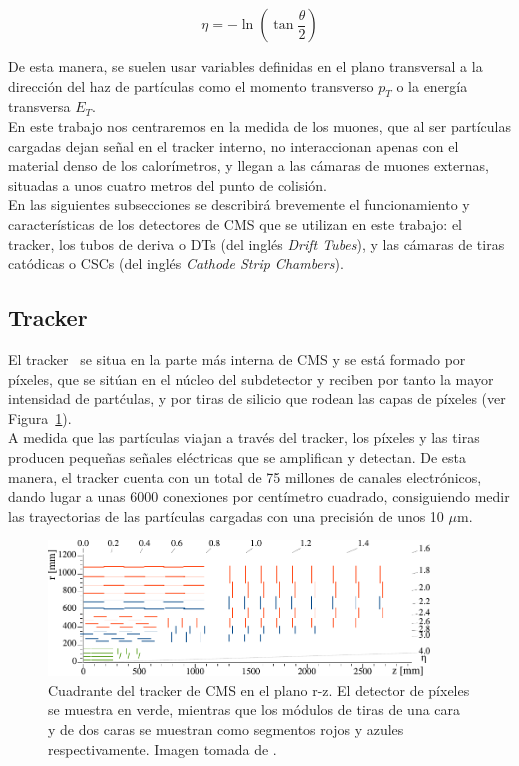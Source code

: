 \begin{equation}
  \eta = -\ln\left(\tan\dfrac{\theta}{2}\right)
\label{eq:eta}
\end{equation}


De esta manera, se suelen usar variables definidas en el plano transversal a la dirección del haz de partículas como el momento transverso $p_{T}$ o la energía transversa $E_{T}$. \\

En este trabajo nos centraremos en la medida de los muones, que al ser part\'iculas cargadas dejan se\~nal en el tracker interno, no interaccionan apenas con el material denso de los calor\'imetros, y llegan a las c\'amaras de muones externas, situadas a unos cuatro metros del punto de colisi\'on. \\
En las siguientes subsecciones se describir\'a brevemente el funcionamiento y caracter\'isticas de los detectores de CMS que se utilizan en este trabajo: el tracker, los tubos de deriva o DTs (del ingl\'es \textit{Drift Tubes}), y las c\'amaras de tiras cat\'odicas o CSCs (del ingl\'es \textit{Cathode Strip Chambers}).

\subsection{Tracker}\label{sec:tracker}

El tracker~\cite{trackerperformance} se situa en la parte m\'as interna de CMS y se est\'a formado por p\'ixeles, que se sit\'uan en el n\'ucleo del subdetector y reciben por tanto la mayor intensidad de part\'culas, y por tiras de silicio que rodean las capas de p\'ixeles (ver Figura~\ref{fig:tracker}). \\ 

A medida que las part\'iculas viajan a trav\'es del tracker, los p\'ixeles y las tiras producen peque\~nas se\~nales el\'ectricas que se amplifican y detectan. De esta manera, el tracker cuenta con un total de 75 millones de canales electr\'onicos, dando lugar a unas 6000 conexiones por cent\'imetro cuadrado, consiguiendo medir las trayectorias de las part\'iculas cargadas con una precisi\'on de unos 10 $\mu$m.  \\

\begin{figure}[h]
\centering
\includegraphics[width=0.9\textwidth]{figures/Phase1_Tracker_1Quarter.png}
\caption{Cuadrante del tracker de CMS en el plano r-z. El detector de p\'ixeles se muestra en verde, mientras que los m\'odulos de tiras de una cara y de dos caras se muestran como segmentos rojos y azules respectivamente. Imagen tomada de \cite{trackerplot}.}
\label{fig:tracker}
\end{figure}


